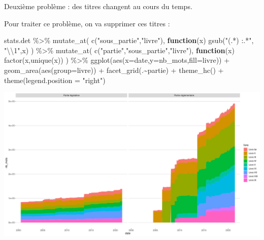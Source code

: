 \documentclass[
  oneside]{book}
\newenvironment{Shaded}{\begin{snugshade}}{\end{snugshade}}
\newcommand{\AttributeTok}[1]{\textcolor[rgb]{0.77,0.63,0.00}{#1}}
\newcommand{\ControlFlowTok}[1]{\textcolor[rgb]{0.13,0.29,0.53}{\textbf{#1}}}
\newcommand{\FunctionTok}[1]{\textcolor[rgb]{0.00,0.00,0.00}{#1}}
\newcommand{\NormalTok}[1]{#1}
\newcommand{\SpecialCharTok}[1]{\textcolor[rgb]{0.00,0.00,0.00}{#1}}
\newcommand{\StringTok}[1]{\textcolor[rgb]{0.31,0.60,0.02}{#1}}
\begin{document}
Deuxième problème : des titres changent au cours du temps.

Pour traiter ce problème, on va supprimer ces titres :

\begin{Shaded}
\begin{Highlighting}[]
\NormalTok{stats.det }\SpecialCharTok{\%\textgreater{}\%}
  \FunctionTok{mutate\_at}\NormalTok{(}
    \FunctionTok{c}\NormalTok{(}\StringTok{"sous\_partie"}\NormalTok{,}\StringTok{"livre"}\NormalTok{),}
    \ControlFlowTok{function}\NormalTok{(x) }\FunctionTok{gsub}\NormalTok{(}\StringTok{"(.*) :.*"}\NormalTok{, }\StringTok{"}\SpecialCharTok{\textbackslash{}\textbackslash{}}\StringTok{1"}\NormalTok{,x)}
\NormalTok{    ) }\SpecialCharTok{\%\textgreater{}\%}
    \FunctionTok{mutate\_at}\NormalTok{(}
    \FunctionTok{c}\NormalTok{(}\StringTok{"partie"}\NormalTok{,}\StringTok{"sous\_partie"}\NormalTok{,}\StringTok{"livre"}\NormalTok{),}
    \ControlFlowTok{function}\NormalTok{(x) }\FunctionTok{factor}\NormalTok{(x,}\FunctionTok{unique}\NormalTok{(x))}
\NormalTok{    ) }\SpecialCharTok{\%\textgreater{}\%}
  \FunctionTok{ggplot}\NormalTok{(}\FunctionTok{aes}\NormalTok{(}\AttributeTok{x=}\NormalTok{date,}\AttributeTok{y=}\NormalTok{nb\_mots,}\AttributeTok{fill=}\NormalTok{livre)) }\SpecialCharTok{+}
  \FunctionTok{geom\_area}\NormalTok{(}\FunctionTok{aes}\NormalTok{(}\AttributeTok{group=}\NormalTok{livre)) }\SpecialCharTok{+}
  \FunctionTok{facet\_grid}\NormalTok{(.}\SpecialCharTok{\textasciitilde{}}\NormalTok{partie)  }\SpecialCharTok{+}
  \FunctionTok{theme\_hc}\NormalTok{() }\SpecialCharTok{+} 
  \FunctionTok{theme}\NormalTok{(}\AttributeTok{legend.position =} \StringTok{"right"}\NormalTok{)}
\end{Highlighting}
\end{Shaded}

\includegraphics{05-images_files/figure-latex/det.3-1.pdf}
\end{document}
